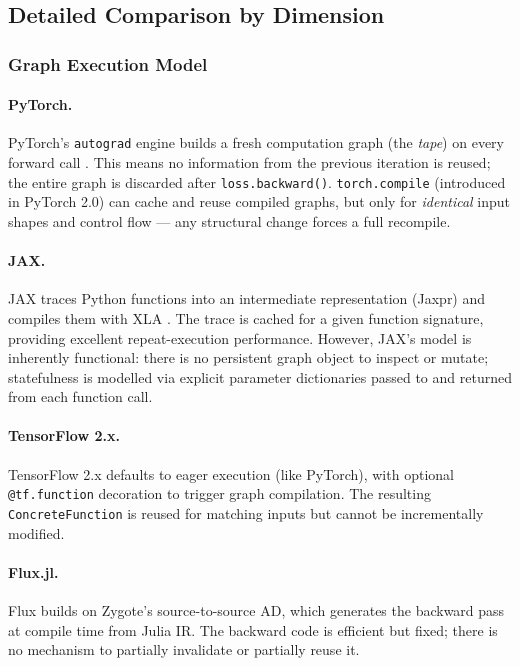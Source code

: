\documentclass{article}
\begin{document}
\subsection{Detailed Comparison by Dimension}

\subsubsection{Graph Execution Model}
\paragraph{PyTorch.} PyTorch's \texttt{autograd} engine builds a fresh computation graph (the \emph{tape}) on every forward call \cite{pytorch}. This means no information from the previous iteration is reused; the entire graph is discarded after \texttt{loss.backward()}. \texttt{torch.compile} (introduced in PyTorch 2.0) can cache and reuse compiled graphs, but only for \emph{identical} input shapes and control flow — any structural change forces a full recompile.

\paragraph{JAX.} JAX traces Python functions into an intermediate representation (Jaxpr) and compiles them with XLA \cite{jax}. The trace is cached for a given function signature, providing excellent repeat-execution performance. However, JAX's model is inherently functional: there is no persistent graph object to inspect or mutate; statefulness is modelled via explicit parameter dictionaries passed to and returned from each function call.

\paragraph{TensorFlow 2.x.} TensorFlow 2.x defaults to eager execution (like PyTorch), with optional \texttt{@tf.function} decoration to trigger graph compilation. The resulting \texttt{ConcreteFunction} is reused for matching inputs but cannot be incrementally modified.

\paragraph{Flux.jl.} Flux builds on Zygote's source-to-source AD, which generates the backward pass at compile time from Julia IR. The backward code is efficient but fixed; there is no mechanism to partially invalidate or partially reuse it.
\end{document}
